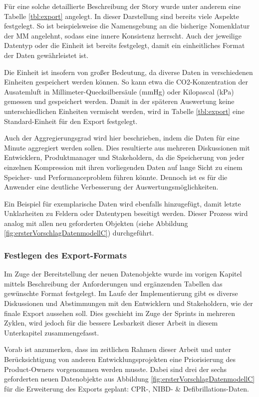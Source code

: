 Für eine solche detaillierte Beschreibung der Story wurde unter anderem eine Tabelle \ref{tbl:export} angelegt.
In dieser Darstellung sind bereits viele Aspekte festgelegt.
So ist beispielsweise die Namensgebung an die bisherige Nomenklatur der \gls{MM} angelehnt, sodass eine innere Konsistenz herrscht.
Auch der jeweilige Datentyp oder die Einheit ist bereits festgelegt, damit ein einheitliches Format der Daten gewährleistet ist.

Die Einheit ist insofern von großer Bedeutung, da diverse Daten in verschiedenen Einheiten gespeichert werden können.
So kann etwa die CO2-Konzentration der Ausatemluft in Millimeter-Quecksilbersäule (mmHg) oder Kilopascal (kPa) gemessen und gespeichert werden.
Damit in der späteren Auswertung keine unterschiedlichen Einheiten vermischt werden, wird in Tabelle \ref{tbl:export} eine Standard-Einheit für den Export festgelegt.

Auch der Aggregierungsgrad wird hier beschrieben, indem die Daten für eine Minute aggregiert werden sollen.
Dies resultierte aus mehreren Diskussionen mit Entwicklern, Produktmanager und Stakeholdern, da die Speicherung von jeder einzelnen Kompression mit ihren vorliegenden Daten auf lange Sicht zu einem Speicher- und Performanceproblem führen könnte.
Dennoch ist es für die Anwender eine deutliche Verbesserung der Auswertungsmöglichkeiten.

Ein Beispiel für exemplarische Daten wird ebenfalls hinzugefügt, damit letzte Unklarheiten zu Feldern oder Datentypen beseitigt werden.
Dieser Prozess wird analog mit allen neu geforderten Objekten (siehe Abbildung \ref{fig:ersterVorschlagDatenmodellC}) durchgeführt. 

\subsubsection{Festlegen des Export-Formats}
Im Zuge der Bereitstellung der neuen Datenobjekte wurde im vorigen Kapitel mittels Beschreibung der Anforderungen und ergänzenden Tabellen das gewünschte Format festgelegt.
Im Laufe der Implementierung gibt es diverse Diskussionen und Abstimmungen mit den Entwicklern und Stakeholdern, wie der finale Export aussehen soll.
Dies geschieht im Zuge der \glqq Sprints\grqq{} in mehreren Zyklen, wird jedoch für die bessere Lesbarkeit dieser Arbeit in diesem Unterkapitel zusammengefasst.

Vorab ist anzumerken, dass im zeitlichen Rahmen dieser Arbeit und unter Berücksichtigung von anderen Entwicklungsprojekten eine Priorisierung des Product-Owners vorgenommen werden musste.
Dabei sind drei der sechs geforderten neuen Datenobjekte aus Abbildung \ref{fig:ersterVorschlagDatenmodellC} für die Erweiterung des Exports  geplant: \gls{CPR}-, \gls{NIBD}- \& Defibrillations-Daten.

